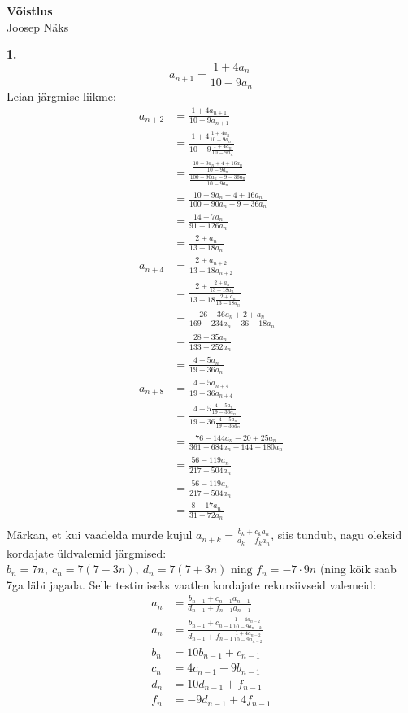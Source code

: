 \documentclass{article}
\begin{document}
\begin{center}
\Large\textbf{V\~oistlus}\\
\small{Joosep N\"aks}
\end{center}
\textbf{1.}\\
\begin{equation*}
a_{n+1}=\frac{1+4a_n}{10-9a_n}
\end{equation*}
Leian j\"argmise liikme:
\begin{equation*}
\begin{aligned}
a_{n+2}&=\frac{1+4a_{n+1}}{10-9a_{n+1}}\\
&=\frac{1+4\frac{1+4a_n}{10-9a_n}}{10-9\frac{1+4a_n}{10-9a_n}}\\
&=\frac{\frac{10-9a_n+4+16a_n}{10-9a_n}}{\frac{100-90a_n-9-36a_n}{10-9a_n}}\\
&=\frac{10-9a_n+4+16a_n}{100-90a_n-9-36a_n}\\
&=\frac{14+7a_n}{91-126a_n}\\
&=\frac{2+a_n}{13-18a_n}\\
a_{n+4}&=\frac{2+a_{n+2}}{13-18a_{n+2}}\\
&=\frac{2+\frac{2+a_n}{13-18a_n}}{13-18\frac{2+a_n}{13-18a_n}}\\
&=\frac{26-36a_n+2+a_n}{169-234a_n-36-18a_n}\\
&=\frac{28-35a_n}{133-252a_n}\\
&=\frac{4-5a_n}{19-36a_n}\\
a_{n+8}&=\frac{4-5a_{n+4}}{19-36a_{n+4}}\\
&=\frac{4-5\frac{4-5a_n}{19-36a_n}}{19-36\frac{4-5a_n}{19-36a_n}}\\
&=\frac{76-144a_n-20+25a_n}{361-684a_n-144+180a_n}\\
&=\frac{56-119a_n}{217-504a_n}\\
&=\frac{56-119a_n}{217-504a_n}\\
&=\frac{8-17a_n}{31-72a_n}\\
\end{aligned}
\end{equation*}
M\"arkan, et kui vaadelda murde kujul $\displaystyle a_{n+k}=\frac{b_k+c_ka_n}{d_k+f_ka_n}$, siis tundub, nagu oleksid kordajate \"uldvalemid j\"argmised: $b_n=7n,\ c_n=7(7-3n),\ d_n=7(7+3n)\text{ ning }f_n=-7\cdot9n$ (ning k\~oik saab 7ga l\"abi jagada. Selle testimiseks vaatlen kordajate rekursiivseid valemeid:
\begin{equation*}
\begin{aligned}
a_n&=\frac{b_{n-1}+c_{n-1}a_{n-1}}{d_{n-1}+f_{n-1}a_{n-1}}\\
a_{n}&=\frac{b_{n-1}+c_{n-1}\frac{1+4a_{n-2}}{10-9a_{n-2}}}{d_{n-1}+f_{n-1}\frac{1+4a_{n-2}}{10-9a_{n-2}}}\\
b_n&=10b_{n-1}+c_{n-1}\\
c_n&=4c_{n-1}-9b_{n-1}\\
d_n&=10d_{n-1}+f_{n-1}\\
f_n&=-9d_{n-1}+4f_{n-1}
\end{aligned}
\end{equation*}
\end{document}
